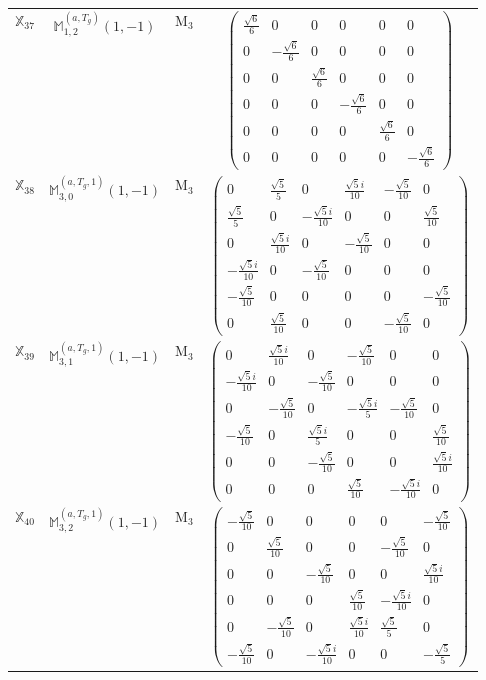 \documentclass[fleqn,10pt,landscape]{article}
\begin{document}
\begin{itemize}
\begin{center}
\begin{longtable}{c|c|c|c}
$ \mathbb{X}_{37} $ & $\mathbb{M}_{1,2}^{(a,T_{g})}(1,-1)$ & M$_{3}$ & $\begin{pmatrix} \frac{\sqrt{6}}{6} & 0 & 0 & 0 & 0 & 0 \\ 0 & - \frac{\sqrt{6}}{6} & 0 & 0 & 0 & 0 \\ 0 & 0 & \frac{\sqrt{6}}{6} & 0 & 0 & 0 \\ 0 & 0 & 0 & - \frac{\sqrt{6}}{6} & 0 & 0 \\ 0 & 0 & 0 & 0 & \frac{\sqrt{6}}{6} & 0 \\ 0 & 0 & 0 & 0 & 0 & - \frac{\sqrt{6}}{6} \end{pmatrix}$ \\
$ \mathbb{X}_{38} $ & $\mathbb{M}_{3,0}^{(a,T_{g},1)}(1,-1)$ & M$_{3}$ & $\begin{pmatrix} 0 & \frac{\sqrt{5}}{5} & 0 & \frac{\sqrt{5} i}{10} & - \frac{\sqrt{5}}{10} & 0 \\ \frac{\sqrt{5}}{5} & 0 & - \frac{\sqrt{5} i}{10} & 0 & 0 & \frac{\sqrt{5}}{10} \\ 0 & \frac{\sqrt{5} i}{10} & 0 & - \frac{\sqrt{5}}{10} & 0 & 0 \\ - \frac{\sqrt{5} i}{10} & 0 & - \frac{\sqrt{5}}{10} & 0 & 0 & 0 \\ - \frac{\sqrt{5}}{10} & 0 & 0 & 0 & 0 & - \frac{\sqrt{5}}{10} \\ 0 & \frac{\sqrt{5}}{10} & 0 & 0 & - \frac{\sqrt{5}}{10} & 0 \end{pmatrix}$ \\
$ \mathbb{X}_{39} $ & $\mathbb{M}_{3,1}^{(a,T_{g},1)}(1,-1)$ & M$_{3}$ & $\begin{pmatrix} 0 & \frac{\sqrt{5} i}{10} & 0 & - \frac{\sqrt{5}}{10} & 0 & 0 \\ - \frac{\sqrt{5} i}{10} & 0 & - \frac{\sqrt{5}}{10} & 0 & 0 & 0 \\ 0 & - \frac{\sqrt{5}}{10} & 0 & - \frac{\sqrt{5} i}{5} & - \frac{\sqrt{5}}{10} & 0 \\ - \frac{\sqrt{5}}{10} & 0 & \frac{\sqrt{5} i}{5} & 0 & 0 & \frac{\sqrt{5}}{10} \\ 0 & 0 & - \frac{\sqrt{5}}{10} & 0 & 0 & \frac{\sqrt{5} i}{10} \\ 0 & 0 & 0 & \frac{\sqrt{5}}{10} & - \frac{\sqrt{5} i}{10} & 0 \end{pmatrix}$ \\
$ \mathbb{X}_{40} $ & $\mathbb{M}_{3,2}^{(a,T_{g},1)}(1,-1)$ & M$_{3}$ & $\begin{pmatrix} - \frac{\sqrt{5}}{10} & 0 & 0 & 0 & 0 & - \frac{\sqrt{5}}{10} \\ 0 & \frac{\sqrt{5}}{10} & 0 & 0 & - \frac{\sqrt{5}}{10} & 0 \\ 0 & 0 & - \frac{\sqrt{5}}{10} & 0 & 0 & \frac{\sqrt{5} i}{10} \\ 0 & 0 & 0 & \frac{\sqrt{5}}{10} & - \frac{\sqrt{5} i}{10} & 0 \\ 0 & - \frac{\sqrt{5}}{10} & 0 & \frac{\sqrt{5} i}{10} & \frac{\sqrt{5}}{5} & 0 \\ - \frac{\sqrt{5}}{10} & 0 & - \frac{\sqrt{5} i}{10} & 0 & 0 & - \frac{\sqrt{5}}{5} \end{pmatrix}$ \\

\end{longtable}
\end{center}
\end{itemize}
\end{document}
